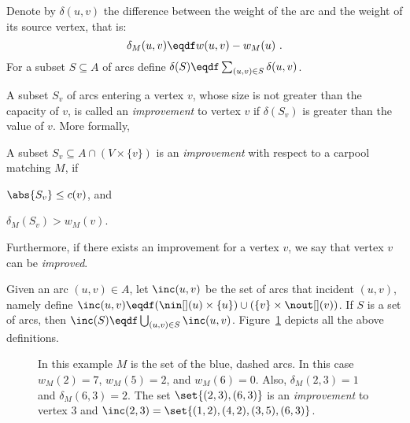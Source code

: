 Denote by $\delta(u,v)$ the difference between the weight of the arc
and the weight of its source vertex, that is:
\[
\delta_M(u, v) \eqdf w(u, v) - w_M(u)
~.
\]
For a subset $S \subseteq A$ of arcs define
$\delta(S) \eqdf \sum_{(u,v) \in S} \delta(u,v)$.

A subset $S_v$ of arcs entering a vertex $v$, whose size is not
greater than the capacity of $v$, is called an \emph{improvement} to
vertex $v$ if $\delta(S_v)$ is greater than the value of $v$.  More
formally, 

\begin{definition}
A subset $S_v \subseteq A \cap (V \times \{v\})$ is
an \emph{improvement} with respect to a carpool matching $M$, if%
\begin{inparaenum}[(i)]
\item $\abs{S_v} \leq c(v)$, and
\item $\delta_M(S_v) > w_M(v)$.
\end{inparaenum}
Furthermore, if there exists an improvement for a vertex $v$, we say
that vertex $v$ can be \emph{improved}.
\end{definition}

Given an arc $(u,v) \in A$, let $\inc(u,v)$ be the set of arcs that
incident $(u, v)$, namely define
\(
\inc(u,v) \eqdf (\nin[](u) \times \{u\}) \cup (\{v\} \times \nout[](v))
\).
If $S$ is a set of arcs, then $\inc(S) \eqdf \bigcup_{(u,v) \in
S} \inc(u,v)$.
%
Figure~\ref{fig:defs} depicts all the above definitions.

\begin{figure}
\centering
{}
\caption[Carpool - Local search improvement]{In this example $M$ is the set of the blue, dashed arcs.
In this case $w_M(2) = 7$, $w_M(5) = 2$, and $w_M(6) = 0$.  Also,
$\delta_M(2, 3) = 1$ and $\delta_M(6, 3) = 2$.  The set $\set{(2,3),
(6,3)}$ is an \emph{improvement} to vertex 3 and $\inc(2,3)
= \set{(1,2),(4,2),(3,5),(6,3)}$.}
\label{fig:defs}
\end{figure}

